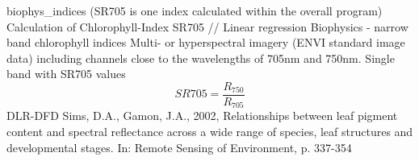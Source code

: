 { %
biophys\_indices (SR705 is one index calculated within the overall program)
}
{ %
Calculation of Chlorophyll-Index SR705 // Linear regression
}
{ %
Biophysics - narrow band chlorophyll indices
}
{ %
Multi- or hyperspectral imagery (ENVI standard image data) including channels close to the wavelengths of 705nm and 750nm.\bigskip
}
{ %
Single band with SR705 values
}
{ %
\begin{displaymath}
SR705 = \frac{R_{750}}{R_{705}}
\end{displaymath}
}
{ %
DLR-DFD
}
{ %
Sims, D.A., Gamon, J.A., 2002, Relationships between leaf pigment content and spectral reflectance across a wide range of species, leaf structures and developmental stages. In: Remote Sensing of Environment, p. 337-354
}


